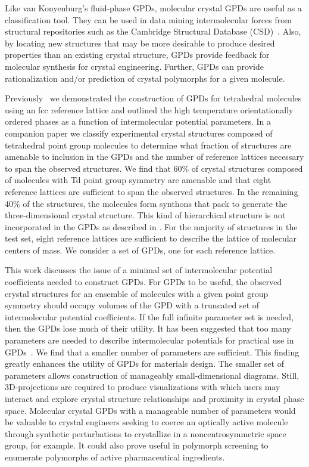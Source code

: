 \documentclass[preprint]{iucr}              %
\begin{document}
Like van Konyenburg's fluid-phase GPDs, molecular crystal GPDs are useful as a classification tool.  They can be used in data mining intermolecular forces from structural repositories such as the Cambridge Structural Database (CSD)~\cite{Allen02}.  Also, by locating new structures that may be more desirable to produce desired properties than an existing crystal structure, GPDs provide feedback for molecular synthesis for crystal engineering. Further, GPDs can provide rationalization and/or prediction of crystal polymorphs for a given molecule.

Previously~\cite{Mettes04} we demonstrated the construction of GPDs for tetrahedral molecules using an fcc reference lattice and outlined the high temperature orientationally ordered phases as a function of intermolecular potential parameters.  In a companion paper\cite{McClurg09} we classify experimental crystal structures composed of tetrahedral point group molecules to determine what fraction of structures are amenable to inclusion in the GPDs and the number of reference lattices necessary to span the observed structures.  We find that 60\% of crystal structures composed of molecules with Td point group symmetry are amenable and that eight reference lattices are sufficient to span the observed structures.  In the remaining 40\% of the structures, the molecules form synthons that pack to generate the three-dimensional crystal structure.  This kind of hierarchical structure is not incorporated in the GPDs as described in \cite{Mettes04}.  For the majority of structures in the test set, eight reference lattices are sufficient to describe the lattice of molecular centers of mass.  We consider a set of GPDs, one for each reference lattice.  

This work discusses the issue of a minimal set of intermolecular potential coefficients needed to construct GPDs.  For GPDs to be useful, the observed crystal structures for an ensemble of molecules with a given point group symmetry should occupy volumes of the GPD with a truncated set of intermolecular potential coefficients.  If the full infinite parameter set is needed, then the GPDs lose much of their utility.  It has been suggested that too many parameters are needed to describe intermolecular potentials for practical use in GPDs~\cite{Briels80}.  We find that a smaller number of parameters are sufficient.  This finding greatly enhances the utility of GPDs for materials design. The smaller set of parameters allows construction of manageably small-dimensional diagrams.  Still, 3D-projections are required to produce visualizations with which users may interact and explore crystal structure relationships and proximity in crystal phase space.  Molecular crystal GPDs with a manageable number of parameters would be valuable to crystal engineers seeking to coerce an optically active molecule through synthetic perturbations to crystallize in a noncentrosymmetric space group, for example. It could also prove useful in polymorph screening to enumerate polymorphs of active pharmaceutical ingredients. 
\end{document}
